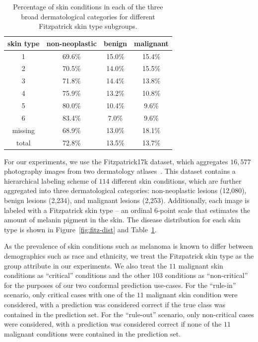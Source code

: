 \documentclass[letterpaper]{article} %
\begin{document}
\begin{table}[t]
\small
\centering
\begin{tabular}{cccc}
\toprule
\textbf{skin type} & \bf{non-neoplastic} & \bf{benign} & \bf{malignant} \\
\midrule
1 & 69.6\% & 15.0\% & 15.4\% \\
2 & 70.5\% & 14.0\% & 15.5\% \\
3 & 71.8\% & 14.4\% & 13.8\% \\
4 & 75.9\% & 13.2\% & 10.8\% \\
5 & 80.0\% & 10.4\% & 9.6\% \\
6 & 83.4\% & 7.0\% & 9.6\% \\
missing & 68.9\% & 13.0\% & 18.1\% \\
\midrule
total & 72.8\% & 13.5\% & 13.7\% \\
\bottomrule
\end{tabular}
\caption{Percentage of skin conditions in each of the three broad dermatological categories for different Fitzpatrick skin type subgroups.}
\label{tab:disease-prevalence}
\end{table}

For our experiments, we use the Fitzpatrick17k dataset, which aggregates $16,577$ photography images from two dermatology atlases~\cite{Groh2021EvaluatingDN}.
This dataset contains a hierarchical labeling scheme of $114$ different skin conditions, which are further aggregated into three dermatological categories: non-neoplastic lesions (12,080), benign lesions (2,234), and malignant lesions (2,253).
Additionally, each image is labeled with a Fitzpatrick skin type -- an ordinal 6-point scale that estimates the amount of melanin pigment in the skin.
The disease distribution for each skin type is shown in Figure~\ref{fig:fitz-dist} and Table~\ref{tab:disease-prevalence}.

As the prevalence of skin conditions such as melanoma is known to differ between demographics such as race and ethnicity, we treat the Fitzpatrick skin type as the group attribute in our experiments.
We also treat the $11$ malignant skin conditions as ``critical'' conditions and the other $103$ conditions as ``non-critical'' for the purposes of our two conformal prediction use-cases.
For the ``rule-in'' scenario, only critical cases with one of the $11$ malignant skin condition were considered, with a prediction was considered correct if the true class was contained in the prediction set.
For the ``rule-out'' scenario, only non-critical cases were considered, with a prediction was considered correct if none of the $11$ malignant conditions were contained in the prediction set.
\end{document}

